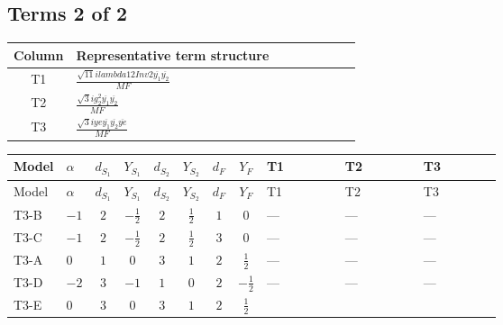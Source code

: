 \documentclass[8pt]{article}
\begin{document}
\begin{landscape}
\subsection*{Terms 2 of 2}
\begin{center}
\begin{tabular}{@{}c >{\raggedright\arraybackslash}p{0.82\linewidth}@{}}
\toprule
Column & Representative term structure \\
\midrule
T1 & \(\displaystyle \frac{\sqrt{11} i lambda12Inv2 \overline{y_{1}} \overline{y_{2}}}{MF}\) \\
\midrule
T2 & \(\displaystyle \frac{\sqrt{3} i g_{2}^{2} \overline{y_{1}} \overline{y_{2}}}{MF}\) \\
\midrule
T3 & \(\displaystyle \frac{\sqrt{3} i ye \overline{y_{1}} \overline{y_{2}} \overline{ye}}{MF}\) \\
\midrule
\bottomrule
\end{tabular}
\end{center}
\smallskip
\tiny
\begin{longtable}{@{}llcccccc >{\raggedright\arraybackslash}p{0.21\linewidth} >{\raggedright\arraybackslash}p{0.21\linewidth} >{\raggedright\arraybackslash}p{0.21\linewidth}@{}}
\toprule
Model & $\alpha$ & $d_{S_1}$ & $Y_{S_1}$ & $d_{S_2}$ & $Y_{S_2}$ & $d_F$ & $Y_F$ & T1 & T2 & T3 \\
\midrule
\endfirsthead
\toprule
Model & $\alpha$ & $d_{S_1}$ & $Y_{S_1}$ & $d_{S_2}$ & $Y_{S_2}$ & $d_F$ & $Y_F$ & T1 & T2 & T3 \\
\midrule
\endhead
T3-B & $-1$ & $2$ & $-\frac{1}{2}$ & $2$ & $\frac{1}{2}$ & $1$ & $0$ & --- & --- & --- \\
\midrule
T3-C & $-1$ & $2$ & $-\frac{1}{2}$ & $2$ & $\frac{1}{2}$ & $3$ & $0$ & --- & --- & --- \\
\midrule
T3-A & $0$ & $1$ & $0$ & $3$ & $1$ & $2$ & $\frac{1}{2}$ & --- & --- & --- \\
\midrule
T3-D & $-2$ & $3$ & $-1$ & $1$ & $0$ & $2$ & $-\frac{1}{2}$ & --- & --- & --- \\
\midrule
T3-E & $0$ & $3$ & $0$ & $3$ & $1$ & $2$ & $\frac{1}{2}$ & \scriptsize\adjustbox{max width=\linewidth}{$\begin{gathered} \frac{3 \sqrt{11} i lambda12Inv2 \overline{y_{1}} \overline{y_{2}}}{22 MF}\end{gathered}$} & \scriptsize\adjustbox{max width=\linewidth}{$\begin{gathered} \frac{11 \sqrt{3} i g_{2}^{2} \overline{y_{1}} \overline{y_{2}}}{8 MF}\end{gathered}$} & \scriptsize\adjustbox{max width=\linewidth}{$\begin{gathered} - \frac{\sqrt{3} i ye \overline{y_{1}} \overline{y_{2}} \overline{ye}}{12 MF}\end{gathered}$} \\
\midrule
\bottomrule
\end{longtable}
\clearpage

\end{landscape}
\end{document}
